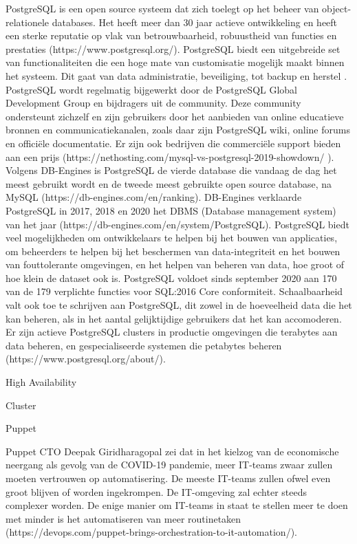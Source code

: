PostgreSQL is een open source systeem dat zich toelegt op het beheer van object-relationele databases. Het heeft meer dan 30 jaar actieve ontwikkeling en heeft een sterke reputatie op vlak van betrouwbaarheid, robuustheid van functies en prestaties (https://www.postgresql.org/). PostgreSQL biedt een uitgebreide set van functionaliteiten die een hoge mate van customisatie mogelijk maakt binnen het systeem. Dit gaat van data administratie, beveiliging, tot backup en herstel . PostgreSQL wordt regelmatig bijgewerkt door de PostgreSQL Global Development Group en bijdragers uit de community. Deze community ondersteunt zichzelf en zijn gebruikers door het aanbieden van online educatieve bronnen en communicatiekanalen, zoals daar zijn PostgreSQL wiki, online forums en officiële documentatie. Er zijn ook bedrijven die commerciële support bieden aan een prijs (https://nethosting.com/mysql-vs-postgresql-2019-showdown/ ). Volgens DB-Engines is PostgreSQL de vierde database die 
vandaag de dag het meest gebruikt wordt en de tweede meest gebruikte open source database, na MySQL (https://db-engines.com/en/ranking). DB-Engines verklaarde PostgreSQL in 2017, 2018 en 2020 het DBMS (Database management system) van het jaar (https://db-engines.com/en/system/PostgreSQL). PostgreSQL biedt veel mogelijkheden om ontwikkelaars te helpen bij het bouwen van applicaties, om beheerders te helpen bij het beschermen van data-integriteit en het bouwen van fouttolerante omgevingen, en het helpen van beheren van data, hoe groot of hoe klein de dataset ook is. PostgreSQL voldoet sinds september 2020 aan 170 van de 179 verplichte functies voor SQL:2016 Core conformiteit. Schaalbaarheid valt ook toe te schrijven aan PostgreSQL, dit zowel in de hoeveelheid data die het kan beheren, als in het aantal gelijktijdige gebruikers dat het kan accomoderen. Er zijn actieve PostgreSQL clusters in productie omgevingen die terabytes aan data beheren, en gespecialiseerde systemen die petabytes beheren (https://www.postgresql.org/about/).




High Availability


Cluster


Puppet

Puppet CTO Deepak Giridharagopal zei dat in het kielzog van de economische neergang als gevolg van de COVID-19 pandemie, meer IT-teams zwaar zullen moeten vertrouwen op automatisering. De meeste IT-teams zullen ofwel even groot blijven of worden ingekrompen. De IT-omgeving zal echter steeds complexer worden. De enige manier om IT-teams in staat te stellen meer te doen met minder is het automatiseren van meer routinetaken (https://devops.com/puppet-brings-orchestration-to-it-automation/).

